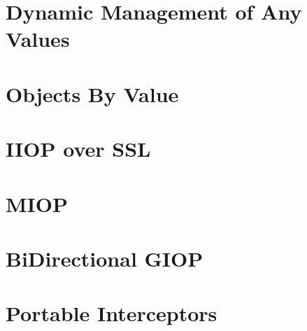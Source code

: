 \documentclass[12pt]{scrbook}
\begin{document}



\chapter{Dynamic Management of Any Values}
\label{ch:dynany}



\chapter{Objects By Value}
\label{ch:obv}




\chapter{IIOP over SSL}
\label{ch:SSL}




\chapter{MIOP}
\label{ch:miop}




\chapter{BiDirectional GIOP}
\label{ch:bidir}




\chapter{Portable Interceptors}
\label{ch:pi}



\end{document}
